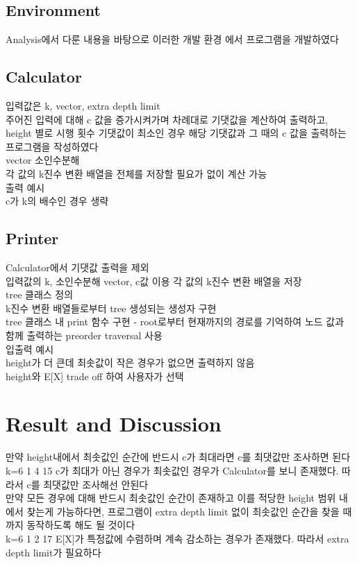\documentclass[11pt]{article}
\begin{document}
\subsection{Environment}
Analysis에서 다룬 내용을 바탕으로 이러한 개발 환경 에서 프로그램을 개발하였다

\subsection{Calculator}
입력값은 k, vector, extra depth limit\\
주어진 입력에 대해 c 값을 증가시켜가며 차례대로 기댓값을 계산하여 출력하고, height 별로 시행 횟수 기댓값이 최소인 경우 해당 기댓값과 그 때의 c 값을 출력하는 프로그램을 작성하였다\\
vector 소인수분해\\
각 값의 k진수 변환 배열을 전체를 저장할 필요가 없이 계산 가능\\
출력 예시\\
c가 k의 배수인 경우 생략

\subsection{Printer}
Calculator에서 기댓값 출력을 제외\\
입력값의 k, 소인수분해 vector, c값 이용 각 값의 k진수 변환 배열을 저장\\
tree 클래스 정의\\
k진수 변환 배열들로부터 tree 생성되는 생성자 구현\\
tree 클래스 내 print 함수 구현 - root로부터 현재까지의 경로를 기억하여 노드 값과 함께 출력하는 preorder traversal 사용\\
입출력 예시\\
height가 더 큰데 최솟값이 작은 경우가 없으면 출력하지 않음\\
height와 E[X] trade off 하여 사용자가 선택

\section{Result and Discussion}

만약 height내에서 최솟값인 순간에 반드시 c가 최대라면 c를 최댓값만 조사하면 된다\\
k=6 {1 4 15} c가 최대가 아닌 경우가 최솟값인 경우가 Calculator를 보니 존재했다. 따라서 c를 최댓값만 조사해선 안된다\\

만약 모든 경우에 대해 반드시 최솟값인 순간이 존재하고 이를 적당한 height 범위 내에서 찾는게 가능하다면, 프로그램이 extra depth limit 없이 최솟값인 순간을 찾을 때까지 동작하도록 해도 될 것이다\\
k=6 {1 2 17} E[X]가 특정값에 수렴하며 계속 감소하는 경우가 존재했다. 따라서 extra depth limit가 필요하다\\
\end{document}
